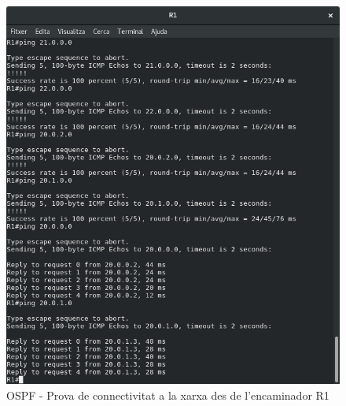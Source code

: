 \documentclass[10pt]{article}
\begin{document}
\begin{figure}[H]
\begin{center}
\includegraphics[scale=0.4]{Images/ospf-R1-conectivity.png}
\caption{OSPF - Prova de connectivitat a la xarxa des de l'encaminador R1}
\end{center}
\end{figure}
\end{document}
